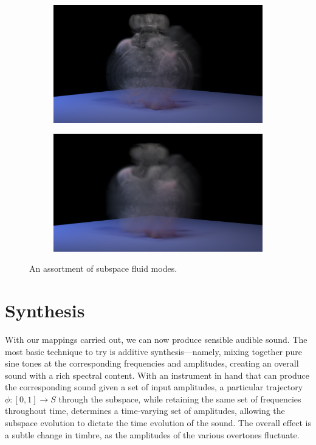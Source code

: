\documentclass[11pt]{article}
\begin{document}
\begin{figure}
\begin{subfigure}[h]{0.5\textwidth}
	\end{subfigure}
	\begin{subfigure}[h]{0.5\textwidth}
		\centering
		\includegraphics[width=\textwidth]{Figures/renders/plume0052.png}		
	\end{subfigure}
	\begin{subfigure}[h]{0.5\textwidth}
		\centering
		\includegraphics[width=\textwidth]{Figures/renders/plume0108.png}		
	\end{subfigure}
	\caption{An assortment of subspace fluid modes.}
\end{figure}

\section*{Synthesis}
With our mappings carried out, we can now produce sensible audible sound. The most basic technique to try is additive synthesis---namely, mixing together pure sine tones at the corresponding frequencies and amplitudes, creating an overall sound with a rich spectral content. With an instrument in hand that can produce the corresponding sound given a set of input amplitudes, a particular trajectory $\phi \colon [0, 1] \rightarrow S$ through the subspace, while retaining the same set of frequencies throughout time, determines a time-varying set of amplitudes, allowing the subspace evolution to dictate the time evolution of the sound. The overall effect is a subtle change in timbre, as the amplitudes of the various overtones fluctuate. 
\end{document}
